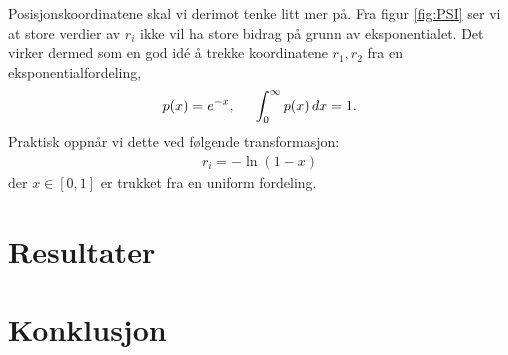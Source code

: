 \documentclass[11pt]{article}
\begin{document}
Posisjonskoordinatene skal vi derimot tenke litt mer på. Fra figur
\ref{fig:PSI} ser vi at store verdier av $r_i$ ikke vil ha store
bidrag på grunn av eksponentialet. Det virker dermed som en god idé å
trekke koordinatene $r_1,r_2$ fra en eksponentialfordeling,
\begin{align}
  p(x) = e^{-x},\hspace{0.5cm}\int_0^\infty p(x)\,dx=1.\label{eq:exponential-prob}
\end{align}
Praktisk oppnår vi dette ved følgende transformasjon:
\begin{align}
  r_i = -\ln \left( 1-x \right)
\end{align}
der $x\in[0,1]$ er trukket fra en uniform fordeling.


\section{Resultater}



\section{Konklusjon}



\printbibliography
\end{document}

